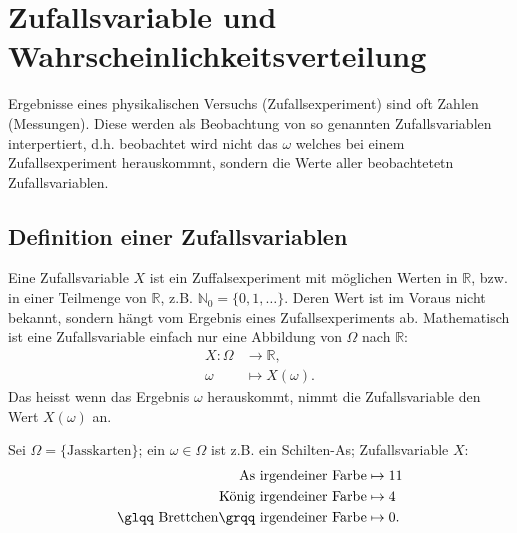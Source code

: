 \chapter{Zufallsvariable und Wahrscheinlichkeitsverteilung}
\label{kap2}
Ergebnisse eines physikalischen Versuchs (Zufallsexperiment) sind oft Zahlen (Messungen). Diese werden als Beobachtung von so genannten Zufallsvariablen interpertiert, d.h. beobachtet wird nicht das $\omega$ welches bei einem Zufallsexperiment herauskommnt, sondern die Werte aller beobachtetetn Zufallsvariablen.
\section{Definition einer Zufallsvariablen}
Eine Zufallsvariable $X$ ist ein Zuffalsexperiment mit möglichen Werten in $\mathbb{R}$, bzw. in einer Teilmenge von $\mathbb{R}$, z.B. $\mathbb{N}_0=\{0,1,\ldots\}$. Deren Wert ist im Voraus nicht bekannt, sondern hängt vom Ergebnis eines Zufallsexperiments ab. Mathematisch ist eine Zufallsvariable einfach nur eine Abbildung von $\Omega$ nach $\mathbb{R}$:
\begin{align*}
	X:\Omega&\to \mathbb{R},\\
	\omega &\mapsto X(\omega).
\end{align*}
Das heisst wenn das Ergebnis $\omega$ herauskommt, nimmt die Zufallsvariable den Wert $X(\omega)$ an.
\begin{bspl}
	Sei $\Omega=\{\text{Jasskarten}\}$; ein $\omega\in\Omega$ ist z.B. ein Schilten-As; Zufallsvariable $X$:
	\begin{align*}
		\text{As irgendeiner Farbe}&\mapsto 11\\
		\text{König irgendeiner Farbe}&\mapsto 4\\
		\text{\glqq Brettchen\grqq\ irgendeiner Farbe}&\mapsto 0.
	\end{align*}
\end{bspl}
